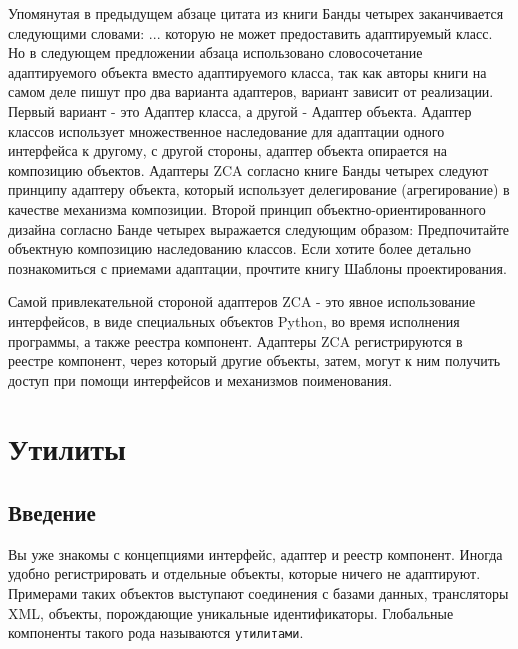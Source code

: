 \documentclass[14pt,a4paper,openany,twoside,final]{extbook}
\begin{document}
Упомянутая в предыдущем абзаце цитата из книги Банды четырех
заканчивается следующими словами: \textquotedbl{} ... которую не может предоставить
адаптируемый класс\textquotedbl{}.  Но в следующем предложении абзаца использовано
словосочетание \textquotedbl{}адаптируемого объекта\textquotedbl{} вместо \textquotedbl{}адаптируемого класса\textquotedbl{},
так как авторы книги на самом деле пишут про два варианта адаптеров,
вариант зависит от реализации.  Первый вариант - это \textquotedbl{}Адаптер класса\textquotedbl{},
а другой - \textquotedbl{}Адаптер объекта\textquotedbl{}.  Адаптер классов использует
множественное наследование для адаптации одного интерфейса к другому,
с другой стороны, адаптер объекта опирается на композицию объектов.
Адаптеры ZCA согласно книге Банды четырех следуют принципу адаптеру
объекта, который использует делегирование (агрегирование) в качестве
механизма композиции.  Второй принцип объектно-ориентированного
дизайна согласно Банде четырех выражается следующим образом:
\textquotedbl{}Предпочитайте объектную композицию наследованию классов\textquotedbl{}.  Если
хотите более детально познакомиться с приемами адаптации, прочтите
книгу \textquotedbl{}Шаблоны проектирования\textquotedbl{}.

Самой привлекательной стороной адаптеров ZCA - это явное использование
интерфейсов, в виде специальных объектов Python, во время исполнения
программы, а также реестра компонент.  Адаптеры ZCA регистрируются в
реестре компонент, через который другие объекты, затем, могут к ним
получить доступ при помощи интерфейсов и механизмов поименования.


\chapter{Утилиты%
  \label{id39}%
}


\section{Введение%
  \label{id40}%
}

Вы уже знакомы с концепциями \textquotedbl{}интерфейс\textquotedbl{}\textquotedbl{}, \textquotedbl{}адаптер\textquotedbl{} и \textquotedbl{}реестр
компонент\textquotedbl{}.  Иногда удобно регистрировать и отдельные объекты, которые
ничего не адаптируют.  Примерами таких объектов выступают соединения с
базами данных, трансляторы XML, объекты, порождающие уникальные
идентификаторы.  Глобальные компоненты такого рода называются
\texttt{утилитами}.
\end{document}
